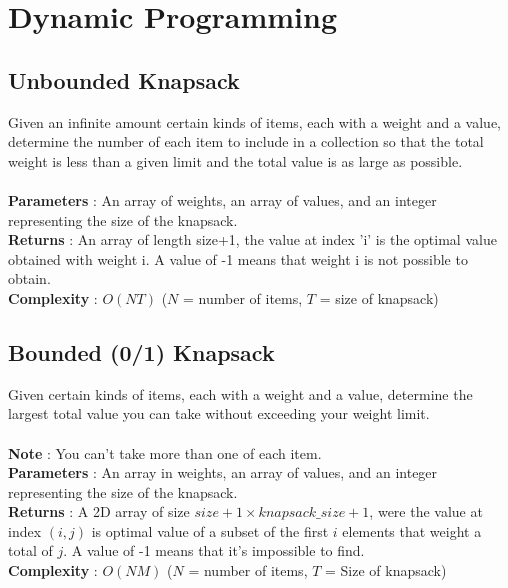
\chapter{Dynamic Programming}
\chapterinfo{}
	\section{Unbounded Knapsack}
	
	Given an infinite amount certain kinds of items, each with a weight and a 
	value, determine the number of each item to include in a collection so that 
	the total weight is less than a given limit and the total value is as large 
	as possible.\\
	\ \\
	{\bf Parameters} : An array of weights, an array of values, and an integer 
	representing the size of the knapsack.\\
	{\bf Returns} : An array of length size+1, the value at index 'i' is the 
	optimal value obtained with weight i. A value of -1 means that weight i is 
	not possible to obtain.\\
	{\bf Complexity} : $O(NT)$ ($N$ = number of items, $T$ = size of knapsack)\\
	
	
	
	\section{Bounded (0/1) Knapsack}
	
	Given certain kinds of items, each with a weight and a value, determine the 
	largest total value you can take without exceeding your weight limit.\\
    \ \\
    {\bf Note} : You can't take more than one of each item.\\
    {\bf Parameters} : An array in weights, an array of values, and an integer 
    representing the size of the knapsack.\\
    {\bf Returns} : A 2D array of size $size+1 \times knapsack\_size+1$, were the value at index 
    $(i,j)$ is optimal value of a subset of the first $i$ elements that weight a total 
    of $j$. A value of -1 means that it’s impossible to find.\\
    {\bf Complexity} : $O(NM)$ ($N$ = number of items, $T$ = Size of knapsack)\\

